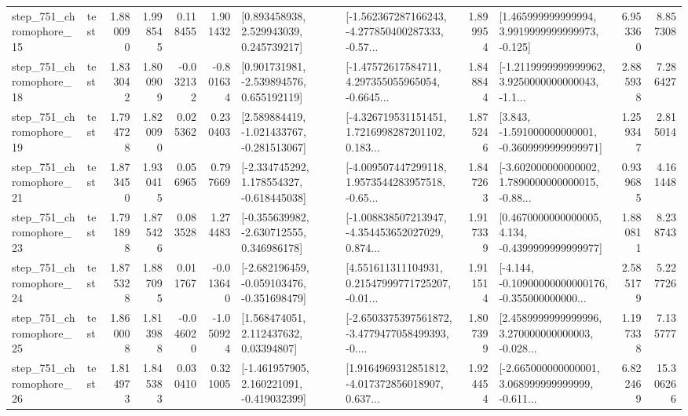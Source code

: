 \begin{tabular}{llrrrrllrlrr}
  step\_751\_chromophore\_15 &      test &      1.880090 &    1.998545 &      0.118455 &  1.901432 &     [0.893458938, 2.529943039, 0.245739217] &  [-1.562367287166243, -4.277850400287333, -0.57... &       1.899954 &    [1.465999999999994, 3.9919999999999973, -0.125] &            6.953360 &          8.857308 \\
  step\_751\_chromophore\_18 &      test &      1.833042 &    1.800909 &     -0.032132 & -0.801634 &    [0.901731981, -2.539894576, 0.655192119] &  [-1.47572617584711, 4.297355055965054, -0.6645... &       1.848844 &  [-1.2119999999999962, 3.9250000000000043, -1.1... &            2.885938 &          7.286427 \\
  step\_751\_chromophore\_19 &      test &      1.794728 &    1.820090 &      0.025362 &  0.230403 &   [2.589884419, -1.021433767, -0.281513067] &  [-4.326719531151451, 1.7216998287201102, 0.183... &       1.875246 &   [3.843, -1.591000000000001, -0.3609999999999971] &            1.259347 &          2.815014 \\
  step\_751\_chromophore\_21 &      test &      1.873450 &    1.930415 &      0.056965 &  0.797669 &   [-2.334745292, 1.178554327, -0.618445038] &  [-4.009507447299118, 1.9573544283957518, -0.65... &       1.847263 &  [-3.602000000000002, 1.7890000000000015, -0.88... &            0.939685 &          4.161448 \\
  step\_751\_chromophore\_23 &      test &      1.791898 &    1.875426 &      0.083528 &  1.274483 &   [-0.355639982, -2.630712555, 0.346986178] &  [-1.008838507213947, -4.354453652027029, 0.874... &       1.917339 &   [0.4670000000000005, 4.134, -0.4399999999999977] &            1.880811 &          8.238743 \\
  step\_751\_chromophore\_24 &      test &      1.875328 &    1.887095 &      0.011767 & -0.013640 &  [-2.682196459, -0.059103476, -0.351698479] &  [4.551611311104931, 0.21547999771725207, -0.01... &       1.911514 &  [-4.144, -0.10900000000000176, -0.355000000000... &            2.585179 &          5.227726 \\
  step\_751\_chromophore\_25 &      test &      1.860008 &    1.813988 &     -0.046020 & -1.050924 &      [1.568474051, 2.112437632, 0.03394807] &  [-2.6503375397561872, -3.4779477058499393, -0.... &       1.807399 &  [2.4589999999999996, 3.270000000000003, -0.028... &            1.197338 &          7.135777 \\
  step\_751\_chromophore\_26 &      test &      1.814973 &    1.845383 &      0.030410 &  0.321005 &   [-1.461957905, 2.160221091, -0.419032399] &  [1.9164969312851812, -4.017372856018907, 0.637... &       1.924454 &  [-2.665000000000001, 3.068999999999999, -0.611... &            6.822469 &         15.306266 \\

\end{tabular}
